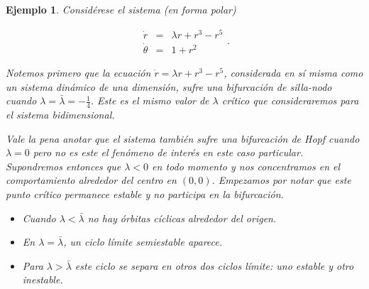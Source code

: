 \documentclass[11pt]{book}
\theoremstyle{definition}
\numberwithin{definition}{section}
\theoremstyle{theorem}
\numberwithin{theorem}{section}
\numberwithin{lemma}{section}
\numberwithin{corollary}{section}
\theoremstyle{plain}
\newtheorem{example}{Ejemplo}
\numberwithin{example}{section}
\begin{document}
\begin{example} \label{ex:bifurcacionsillanododeciclos}
Considérese el sistema (en forma polar)

\begin{equation}
	\begin{array}{lll}
		\dot{r} & = & \lambda r + r^3 - r^5 \\
		\dot{\theta} & = & 1 + r^2
	\end{array}.
\end{equation}

Notemos primero que la ecuación $\dot{r} = \lambda r + r^3 - r^5$, considerada en sí misma como un sistema dinámico de una dimensión, sufre una bifurcación de silla-nodo cuando $\lambda = \bar{\lambda} = - \frac{1}{4}$. Este es el mismo valor de $\lambda$ crítico que consideraremos para el sistema bidimensional.

Vale la pena anotar que el sistema también sufre una bifurcación de Hopf cuando $\lambda = 0$ pero no es este el fenómeno de interés en este caso particular. Supondremos entonces que $\lambda < 0$ en todo momento y nos concentramos en el comportamiento alrededor del centro en $(0,0)$. Empezamos por notar que este punto crítico permanece estable y no participa en la bifurcación. 

\begin{itemize}
	\item Cuando $\lambda < \bar{\lambda}$ no hay órbitas cíclicas alrededor del origen.
	\item En $\lambda = \bar{\lambda}$, un ciclo límite semiestable aparece.
	\item Para $\lambda > \bar{\lambda}$ este ciclo se separa en otros dos ciclos límite: uno estable y otro inestable.
\end{itemize}


\end{example}
\end{document}
